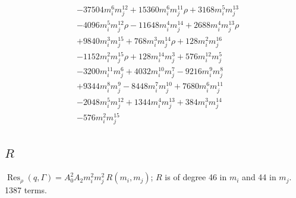 {\begin{align*}
&-37504m_i^{6}m_j^{12}+15360m_i^{6}m_j^{11}\rho+3168m_i^{5}m_j^{13}\\
&-4096m_i^{5}m_j^{12}\rho-11648m_i^{4}m_j^{14}+2688m_i^{4}m_j^{13}\rho\\
&+9840m_i^{3}m_j^{15}+768m_i^{3}m_j^{14}\rho+128m_i^{2}m_j^{16}\\
&-1152m_i^{2}m_j^{15}\rho+128m_i^{14}m_j^{3}+576m_i^{12}m_j^{5}\\
&-3200m_i^{11}m_j^{6}+4032m_i^{10}m_j^{7}-9216m_i^{9}m_j^{8}\\
&+9344m_i^{8}m_j^{9}-8448m_i^{7}m_j^{10}+7680m_i^{6}m_j^{11}\\
&-2048m_i^{5}m_j^{12}+1344m_i^{4}m_j^{13}+384m_i^{3}m_j^{14}\\
&-576m_i^{2}m_j^{15}
\end{align*}
}

\subsection*{$R$}
$\operatorname{Res}_\rho(q,\Gamma)=A_0^2A_2m_i^2m_j^2\,R(m_i,m_j)$; $R$ is of degree 46 in $m_i$ and 44 in $m_j$. 1387 terms.
